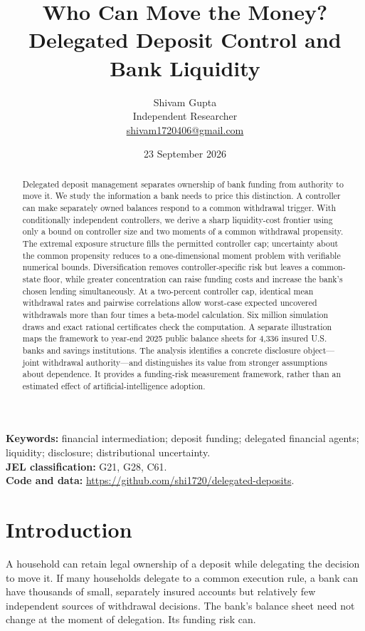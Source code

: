 \documentclass[11pt]{article}
\title{\vspace{-0.7cm}\textbf{Who Can Move the Money?}\\[0.2em]
Delegated Deposit Control and Bank Liquidity}
\author{Shivam Gupta\\\small Independent Researcher\\
\small\href{mailto:shivam1720406@gmail.com}{shivam1720406@gmail.com}}
\date{23 September 2026}
\theoremstyle{definition}\newtheorem{definition}[theorem]{Definition}
\begin{document}
\maketitle
\begin{abstract}
Delegated deposit management separates ownership of bank funding from authority to move it. We study the information a bank needs to price this distinction. A controller can make separately owned balances respond to a common withdrawal trigger. With conditionally independent controllers, we derive a sharp liquidity-cost frontier using only a bound on controller size and two moments of a common withdrawal propensity. The extremal exposure structure fills the permitted controller cap; uncertainty about the common propensity reduces to a one-dimensional moment problem with verifiable numerical bounds. Diversification removes controller-specific risk but leaves a common-state floor, while greater concentration can raise funding costs and increase the bank's chosen lending simultaneously. At a two-percent controller cap, identical mean withdrawal rates and pairwise correlations allow worst-case expected uncovered withdrawals more than four times a beta-model calculation. Six million simulation draws and exact rational certificates check the computation. A separate illustration maps the framework to year-end 2025 public balance sheets for 4,336 insured U.S. banks and savings institutions. The analysis identifies a concrete disclosure object---joint withdrawal authority---and distinguishes its value from stronger assumptions about dependence. It provides a funding-risk measurement framework, rather than an estimated effect of artificial-intelligence adoption.
\end{abstract}
\noindent\textbf{Keywords:} financial intermediation; deposit funding; delegated financial agents; liquidity; disclosure; distributional uncertainty.\\
\textbf{JEL classification:} G21, G28, C61.\\
\textbf{Code and data:} \url{https://github.com/shi1720/delegated-deposits}.

\section{Introduction}
A household can retain legal ownership of a deposit while delegating the decision to move it. If many households delegate to a common execution rule, a bank can have thousands of small, separately insured accounts but relatively few independent sources of withdrawal decisions. The bank's balance sheet need not change at the moment of delegation. Its funding risk can.
\end{document}
